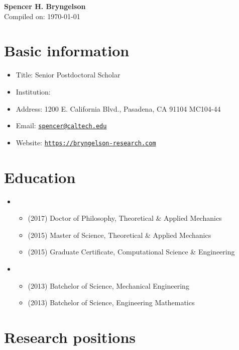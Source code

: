 



\begin{center}
    {\LARGE \bf Spencer H. Bryngelson} \\
    \medskip
    Compiled on: \today
\end{center}

\section{Basic information}
\begin{itemize}
    \item Title: Senior Postdoctoral Scholar
    \item Institution: \CIT
    \item Address: 1200 E. California Blvd., Pasadena, CA 91104 MC104-44
    \item Email: \href{mailto:spencer@caltech.edu}{\texttt{spencer@caltech.edu}}
    \item Website: \href{https://bryngelson-research.com}{\texttt{https://bryngelson-research.com}}
\end{itemize}

\section{Education}

\begin{itemize}
    \item \UIUC
    \begin{itemize}
        \item (2017) Doctor of Philosophy, Theoretical \& Applied Mechanics
        \item (2015) Master of Science, Theoretical \& Applied Mechanics
        \item (2015) Graduate Certificate, Computational Science \& Engineering
    \end{itemize}
    \item \UMD
    \begin{itemize}
        \item (2013) Batchelor of Science, Mechanical Engineering
        \item (2013) Batchelor of Science, Engineering Mathematics
    \end{itemize}
\end{itemize}


\section{Research positions}

